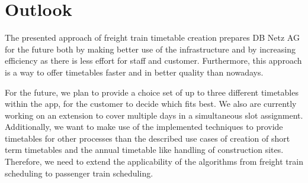 \section{Outlook}
\label{chap:outlook}
The presented approach of freight train timetable creation prepares DB Netz AG for the future both by making better use of the infrastructure and by increasing efficiency as there is less effort for staff and customer. Furthermore, this approach is a way to offer timetables faster and in better quality than nowadays.

For the future, we plan to provide a choice set of up to three different timetables within the app, for the customer to decide which fits best. We also are currently working on an extension to cover multiple days in a simultaneous slot assignment.
Additionally, we want to make use of the implemented techniques to provide timetables for other processes than the described use cases of creation of short term timetables and the annual timetable like handling of construction sites. Therefore, we need to extend the applicability of the algorithms from freight train scheduling to passenger train scheduling.